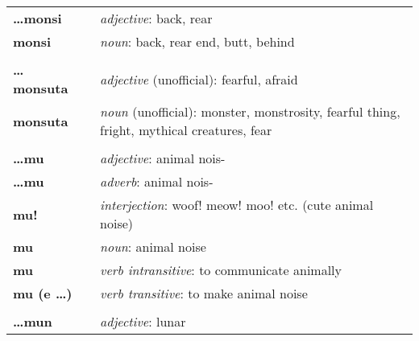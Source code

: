 \begin{supertabular}{p{2,5cm}|ll}
    \textbf{\dots monsi}         &  & \textit{adjective}: back, rear                                                                             \\
    \textbf{monsi}               &  & \textit{noun}: back, rear end, butt, behind                                                                \\
                                 &  &                                                                                                            \\
    \textbf{\dots monsuta}       &  & \textit{adjective} (unofficial): fearful, afraid                                                           \\
    \textbf{monsuta}             &  & \textit{noun} (unofficial): monster, monstrosity, fearful thing, fright, mythical creatures, fear          \\
                                 &  &                                                                                                            \\
    \textbf{\dots mu}            &  & \textit{adjective}: animal nois-                                                                           \\
    \textbf{\dots mu}            &  & \textit{adverb}: animal nois-                                                                              \\
    \textbf{mu!}                 &  & \textit{interjection}: woof! meow! moo! etc. (cute animal noise)                                           \\
    \textbf{mu}                  &  & \textit{noun}: animal noise                                                                                \\
    \textbf{mu}                  &  & \textit{verb intransitive}: to communicate animally                                                        \\
    \textbf{mu (e \dots)}        &  & \textit{verb transitive}: to make animal noise                                                             \\
                                 &  &                                                                                                            \\
    \textbf{\dots mun}           &  & \textit{adjective}: lunar                                                                                  \\

\end{supertabular}
